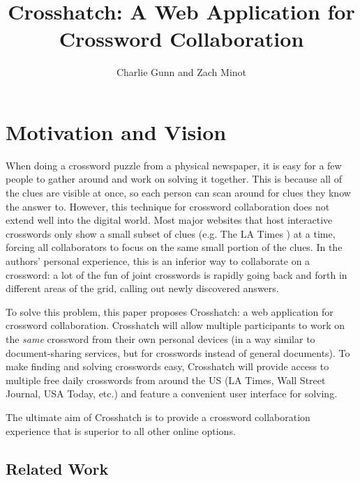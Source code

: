 \documentclass{article}
\author{Charlie Gunn and Zach Minot}
\title{Crosshatch: A Web Application for Crossword Collaboration}
\begin{document}
\maketitle

\section{Motivation and Vision}
\label{mot}
When doing a crossword puzzle from a physical newspaper, it is easy for a few people to gather around and work on solving it together.
This is because all of the clues are visible at once, so each person can scan around for clues they know the answer to. However, this technique
for crossword collaboration does not extend well into the digital world. Most major websites that host interactive crosswords only show a small subset of
clues (e.g. The LA Times \cite{latcrossword}) at a time, forcing all collaborators to focus on the same small portion of the clues. In the authors' personal experience,
this is an inferior way to collaborate on a crossword: a lot of the fun of joint crosswords is rapidly going back and forth in different areas
of the grid, calling out newly discovered answers.

To solve this problem, this paper proposes Crosshatch: a web application for crossword collaboration. Crosshatch will
allow multiple participants to work on the \textit{same} crossword from their own personal devices (in a way similar to document-sharing services,
but for crosswords instead of general documents). To make finding and solving crosswords easy, Crosshatch will provide access to multiple free daily crosswords
from around the US (LA Times, Wall Street Journal, USA Today, etc.) and feature a convenient user interface for solving.

The ultimate aim of Crosshatch is to provide a crossword collaboration experience that is superior to all other online options.
\subsection{Related Work}
\end{document}
